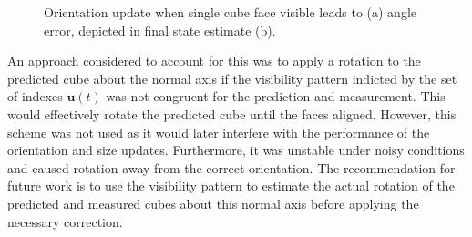 \begin{figure}
\centering
 	\caption{Orientation update when single cube face visible leads to (a) angle error, depicted in final state estimate (b).}
 	\label{fig:orientation_1F}
\end{figure}

An approach considered to account for this was to apply a rotation to the predicted cube about the normal axis if the visibility pattern indicted by the set of indexes $\textbf{u}(t)$ was not congruent for the prediction and measurement. This would effectively rotate the predicted cube until the faces aligned. However, this scheme was not used as it would later interfere with the performance of the orientation and size updates. Furthermore, it was unstable under noisy conditions and caused rotation away from the correct orientation. The recommendation for future work is to use the visibility pattern to estimate the actual rotation of the predicted and measured cubes about this normal axis before applying the necessary correction.

